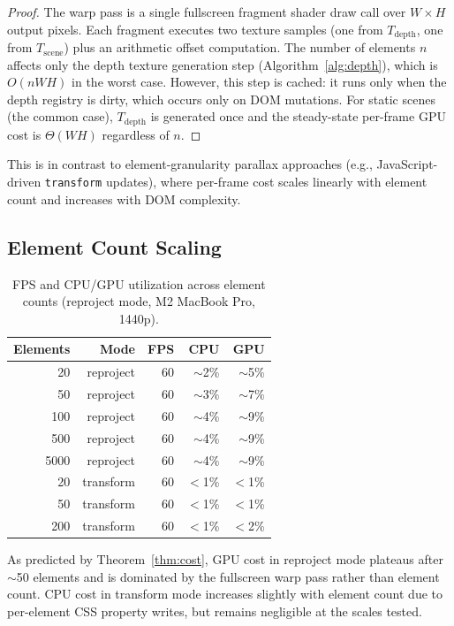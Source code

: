 \documentclass[10pt,twocolumn]{article}
\newcommand{\Tscene}{T_{\mathrm{scene}}}
\newcommand{\Tdepth}{T_{\mathrm{depth}}}
\begin{document}
\begin{proof}
The warp pass is a single fullscreen fragment shader draw call over $W \times H$
output pixels. Each fragment executes two texture samples (one from $\Tdepth$,
one from $\Tscene$) plus an arithmetic offset computation. The number of
elements $n$ affects only the depth texture generation step
(Algorithm~\ref{alg:depth}), which is $O(nWH)$ in the worst case.
However, this step is cached: it runs only when the depth registry is dirty,
which occurs only on DOM mutations. For static scenes (the common case),
$\Tdepth$ is generated once and the steady-state per-frame GPU cost is
$\Theta(WH)$ regardless of $n$.
\end{proof}

This is in contrast to element-granularity parallax approaches (e.g.,
JavaScript-driven \texttt{transform} updates), where per-frame cost scales
linearly with element count and increases with DOM complexity.

\subsection{Element Count Scaling}

\begin{table}[h]
\centering
\caption{FPS and CPU/GPU utilization across element counts (reproject mode, M2 MacBook Pro, 1440p).}
\label{tab:scaling}
\begin{tabular}{rrrrr}
\toprule
Elements & Mode & FPS & CPU & GPU \\
\midrule
20    & reproject & 60 & $\sim$2\% & $\sim$5\% \\
50    & reproject & 60 & $\sim$3\% & $\sim$7\% \\
100   & reproject & 60 & $\sim$4\% & $\sim$9\% \\
500   & reproject & 60 & $\sim$4\% & $\sim$9\% \\
5000  & reproject & 60 & $\sim$4\% & $\sim$9\% \\
\midrule
20    & transform & 60 & $<$1\% & $<$1\% \\
50    & transform & 60 & $<$1\% & $<$1\% \\
200   & transform & 60 & $<$1\% & $<$2\% \\
\bottomrule
\end{tabular}
\end{table}

As predicted by Theorem~\ref{thm:cost}, GPU cost in reproject mode plateaus
after $\sim$50 elements and is dominated by the fullscreen warp pass rather
than element count. CPU cost in transform mode increases slightly with
element count due to per-element CSS property writes, but remains negligible
at the scales tested.
\end{document}
